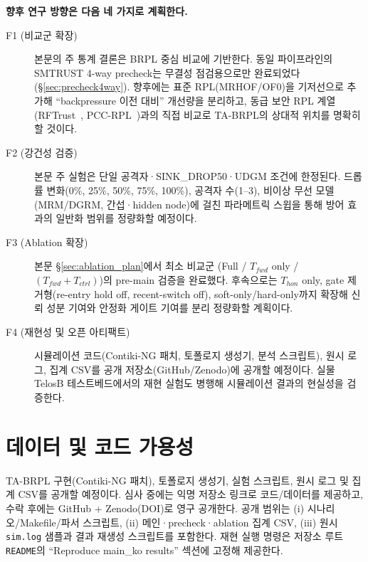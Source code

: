 \documentclass[12pt,a4paper]{article}
\begin{document}
\textbf{향후 연구 방향은 다음 네 가지로 계획한다.}

\begin{description}
  \item[F1 (비교군 확장)]
    본문의 주 통계 결론은 BRPL 중심 비교에 기반한다.
    동일 파이프라인의 SMTRUST 4-way precheck는
    무결성 점검용으로만 완료되었다(\S\ref{sec:precheck4way}).
    향후에는 표준 RPL(MRHOF/OF0)을 기저선으로 추가해
    ``backpressure 이전 대비'' 개선량을 분리하고,
    동급 보안 RPL 계열(RFTrust~\cite{rftrust2021},
    PCC-RPL~\cite{pccrpl2022})과의 직접 비교로
    TA-BRPL의 상대적 위치를 명확히 할 것이다.

  \item[F2 (강건성 검증)]
    본문 주 실험은 단일 공격자·SINK\_DROP50·UDGM 조건에 한정된다.
    드롭률 변화(0\%, 25\%, 50\%, 75\%, 100\%), 공격자 수(1–3),
    비이상 무선 모델(MRM/DGRM, 간섭·hidden node)에 걸친
    파라메트릭 스윕을 통해 방어 효과의 일반화 범위를 정량화할 예정이다.

  \item[F3 (Ablation 확장)]
    본문 \S\ref{sec:ablation_plan}에서 최소 비교군
    (Full / $T_{fwd}$ only / $(T_{fwd}+T_{ctrl})$)의 pre-main 검증을 완료했다.
    후속으로는 $T_{hon}$ only, gate 제거형(re-entry hold off, recent-switch off),
    soft-only/hard-only까지 확장해
    신뢰 성분 기여와 안정화 게이트 기여를 분리 정량화할 계획이다.

  \item[F4 (재현성 및 오픈 아티팩트)]
    시뮬레이션 코드(Contiki-NG 패치, 토폴로지 생성기, 분석 스크립트),
    원시 로그, 집계 CSV를 공개 저장소(GitHub/Zenodo)에 공개할 예정이다.
    실물 TelosB 테스트베드에서의 재현 실험도 병행해
    시뮬레이션 결과의 현실성을 검증한다.
\end{description}


\section*{데이터 및 코드 가용성}
\label{sec:data}

TA-BRPL 구현(Contiki-NG 패치), 토폴로지 생성기, 실험 스크립트,
원시 로그 및 집계 CSV를 공개할 예정이다.
심사 중에는 익명 저장소 링크로 코드/데이터를 제공하고,
수락 후에는 GitHub + Zenodo(DOI)로 영구 공개한다.
공개 범위는 (i) 시나리오/Makefile/파서 스크립트,
(ii) 메인·precheck·ablation 집계 CSV,
(iii) 원시 \texttt{sim.log} 샘플과 결과 재생성 스크립트를 포함한다.
재현 실행 명령은 저장소 루트 \texttt{README}의
``Reproduce main\_ko results'' 섹션에 고정해 제공한다.
\end{document}
